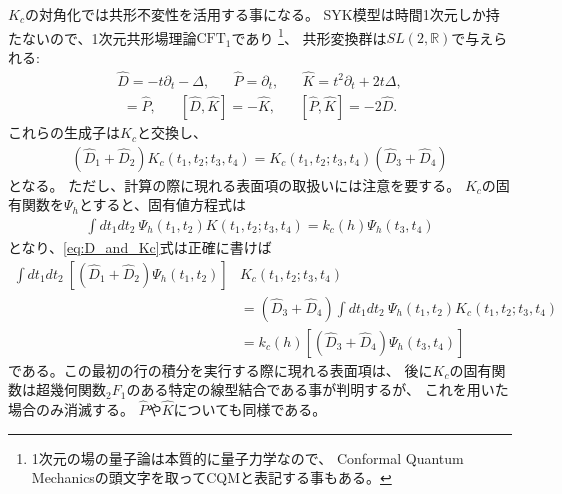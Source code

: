 $K_c$の対角化では共形不変性を活用する事になる。
SYK模型は時間1次元しか持たないので、1次元共形場理論$\mathrm{CFT}_1$であり
\footnote{1次元の場の量子論は本質的に量子力学なので、
Conformal Quantum Mechanicsの頭文字を取ってCQMと表記する事もある。}、
共形変換群は$SL(2, \mathbb{R})$で与えられる\cite{andrzejewski}:
\begin{align}
	\hat{D} = -t\partial_t - \Delta,\hspace{20pt}
	\hat{P} = \partial_t,\hspace{20pt}
	\hat{K} = t^2\partial_t + 2t\Delta,
\end{align}
\begin{align}
	[\hat{D}, \hat{P}] = \hat{P},\hspace{20pt}
	[\hat{D}, \hat{K}] = -\hat{K},\hspace{20pt}
	[\hat{P}, \hat{K}] = -2\hat{D}.
\end{align}
これらの生成子は$K_c$と交換し、
\begin{align}
	(\hat{D}_1 + \hat{D}_2)K_c(t_1, t_2; t_3, t_4)
	= K_c(t_1, t_2; t_3, t_4)(\hat{D}_3 + \hat{D}_4)
	\label{eq:D_and_Kc}
\end{align}
となる。
ただし、計算の際に現れる表面項の取扱いには注意を要する。
$K_c$の固有関数を$\Psi_h$とすると、固有値方程式は
\begin{align}
	\int dt_1dt_2\ \Psi_h(t_1, t_2) K(t_1, t_2; t_3, t_4)
	= k_c(h)\Psi_h(t_3, t_4)
	\label{eq:eigen_eq_of_Kc}
\end{align}
となり、\eqref{eq:D_and_Kc}式は正確に書けば
\begin{align}
	\int dt_1 dt_2\ \left[(\hat{D}_1 + \hat{D}_2)\Psi_h(t_1, t_2)\right]
	&K_c(t_1, t_2; t_3, t_4)\nonumber\\
	&= (\hat{D}_3 + \hat{D}_4)\int dt_1dt_2\ \Psi_h(t_1, t_2) K_c(t_1, t_2; t_3, t_4)
	\nonumber\\
	&= k_c(h)\left[(\hat{D}_3 + \hat{D}_4)\Psi_h(t_3, t_4)\right]
\end{align}
である。この最初の行の積分を実行する際に現れる表面項は、
後に$K_c$の固有関数は超幾何関数${}_2F_1$のある特定の線型結合である事が判明するが、
これを用いた場合のみ消滅する。
$\hat{P}$や$\hat{K}$についても同様である。

